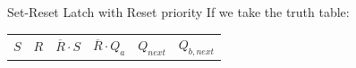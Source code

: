 \begin{parag}{Set-Reset Latch with Reset priority}
       If we take the truth table:
       \begin{center}
       \begin{tabular}{cccccc}
           $S$ & $R$ & $ \overline{R} \cdot S$ & $ \overline{R} \cdot Q_a$ & $Q_{next}$ & $Q_{b, next}$
       \end{tabular}
       \end{center}
       
        
    
    \end{parag}
    

    
    

    
    
